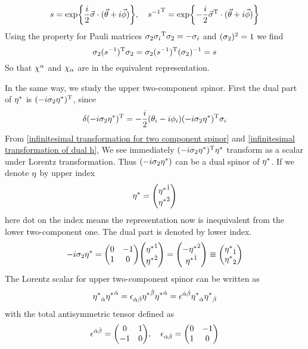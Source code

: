 \begin{equation} \label{finite transformation for upper two component spinor}
s =
\exp{\frac{i}{2}\vec{\sigma}\cdot(\vec{\theta}+i\vec{\phi})},
\quad
{s^{-1}}^{\text{T}} = \exp{-\frac{i}{2}\vec{\sigma}^{\text{T}}\cdot(\vec{\theta}+i\vec{\phi})}
\end{equation}
Using the property for Pauli matrices  $\sigma_2{\sigma_{i}}^{\text{T}}\sigma_2 =- \sigma_i$ and $(\sigma_2)^2 =1$ we find 
\begin{equation} \label{equivalence of upper spinor with its dual space}
\sigma_2(s^{-1})^{\text{T}}\sigma_2 =\sigma_2(s^{-1})^{\text{T}}(\sigma_2)^{-1} =s
\end{equation}
So that $\chi^\alpha$ and $\chi_\alpha$ are in the equivalent representation.

In the same way, we study the upper two-component spinor. First the dual part of ${\eta^*}$ is $(-i\sigma_{2}{\eta^*})^{\text{T}}$, since
\begin{equation} \label{infinitesimal transformation of dual h}
\delta(-i\sigma_{2}{\eta^*})^{\text{T}}
= -\frac{i}{2}(\theta_i-i\phi_i)(-i\sigma_2{\eta^*})^{\text{T}}\sigma_{i}
\end{equation}
From \eqref{infinitesimal transformation for two component spinor} and \eqref{infinitesimal transformation of dual h}, We see immediately
$(-i\sigma_{2}{\eta^*})^{\text{T}}{\eta^*}$ transform as a scalar under Lorentz transformation. Thus $(-i\sigma_{2}{\eta^*})$ can be a dual spinor of ${\eta^*}$. If we denote $\eta$ by upper index
\begin{equation}
  \lh = \mqty({\lh}^{\dot{1}} \\ {\lh}^{\dot{2}})
\end{equation}
here dot on the index means the representation now is inequivalent from the lower two-component one. The dual part is denoted by lower index.
\begin{equation}
  -i\s_2\lh = \mqty(0 & -1 \\ 1 & 0)
           \mqty(\lh^{\dot{1}}\\ \lh^{\dot{2}})
         = \mqty(-\lh^{\dot{2}}\\ \lh^{\dot{1}})
         \equiv \mqty(\lh_{\dot{1}} \\ \lh_{\dot{2}})
\end{equation}
The Lorentz scalar for upper two-component spinor can be written as
\begin{equation}
  {\eta^*}_{\dot{\alpha}}{\eta^*}^{\dot{\alpha}}
= \epsilon_{\dot{\alpha}\dot{\beta}}{\eta^*}^{\dot{\beta}}{\eta^*}^{\dot{\alpha}}
= \epsilon^{\dot{\alpha}\dot{\beta}}{\eta^*}_{\dot{\alpha}}{\eta^*}_{\dot{\beta}}
\end{equation}
with the total antisymmetric tensor defined as
\begin{equation}\label{definition of dotted antisymmetric tensor}
  \e^{\doa\dob} = \mqty(0 & 1 \\ -1 & 0),\quad
\e_{\doa\dob} =\mqty(0 & -1 \\ 1 & 0)
\end{equation}
